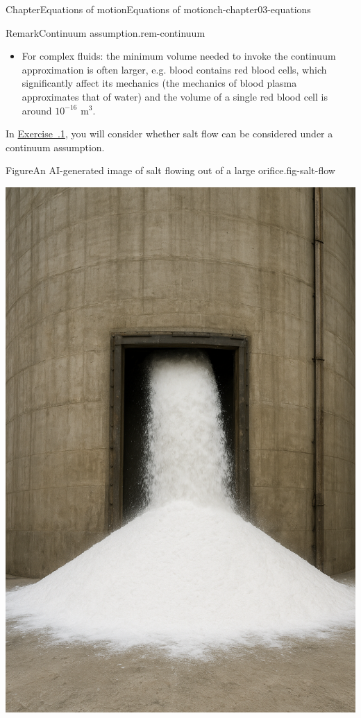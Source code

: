 \documentclass[oneside,10pt,]{book}
\newcommand{\xreffont}{\relax}
\numberwithin{equation}{section}
\begin{document}
\begin{chapterptx}{Chapter}{Equations of motion}{}{Equations of motion}{}{}{ch-chapter03-equations}
\begin{introduction}{}
\begin{remark}{Remark}{Continuum assumption.}{rem-continuum}
\begin{itemize}[label=\textbullet]
\item{}For complex fluids: the minimum volume needed to invoke the continuum approximation is often larger, e.g. blood contains red blood cells, which significantly affect its mechanics (the mechanics of blood plasma approximates that of water) and the volume of a single red blood cell is around \(10^{-16}\) m\(^3\).%
\end{itemize}
%
\end{remark}
In \hyperlink{ex-continuum-assumption}{Exercise~{\xreffont 3.6.1}}, you will consider whether salt flow can be considered under a continuum assumption.%
\begin{figureptx}{Figure}{An AI-generated image of salt flowing out of a large orifice.}{fig-salt-flow}{}%
\begin{image}{0.3}{0.4}{0.3}{}%
\includegraphics[width=\linewidth]{external/saltflow.png}

\end{image}
\end{figureptx}
\end{introduction}
\end{chapterptx}
\end{document}
